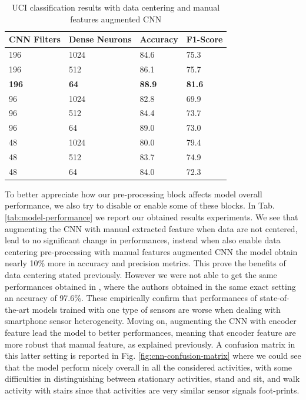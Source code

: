 \begin{table}[h]
	\begin{center}
		\begin{tabular}{ p{1.8cm}p{1.7cm}p{1.7cm}p{1.7cm} }
			\hline
			CNN Filters & Dense Neurons & Accuracy & F1-Score \\
			\hline
			196 & 1024 & 84.6 & 75.3 \\
			196 & 512 & 86.1 & 75.7 \\
			\textbf{196} & \textbf{64} & \textbf{88.9} & \textbf{81.6} \\
			96 & 1024 & 82.8 & 69.9 \\
			96 & 512 & 84.4 & 73.7 \\
			96 & 64 & 89.0 & 73.0 \\
			48 & 1024 & 80.0 & 79.4 \\
			48 & 512 & 83.7 & 74.9 \\
			48 & 64 & 84.0 & 72.3 \\
			\hline
		\end{tabular}
		\caption{\label{tab:model-selection} UCI classification results with data centering and manual features augmented CNN}
	\end{center}
\end{table}


To better appreciate how our pre-processing block affects model overall performance, we also try to disable or enable some of these blocks. In Tab. \ref{tab:model-performance} we report our obtained results experiments. We see that augmenting the CNN with manual extracted feature when data are not centered, lead to no significant change in performances, instead when also enable data centering pre-processing with manual features augmented CNN the model obtain nearly 10\% more in accuracy and precision metrics. This prove the benefits of data centering stated previously. However we were not able to get the same performances obtained in \cite{ignatov2018real}, where the authors obtained in the same exact setting an accuracy of 97.6\%. These empirically confirm that performances of state-of-the-art models trained with one type of sensors are worse when dealing with smartphone sensor heterogeneity. Moving on, augmenting the CNN with encoder feature lead the model to better performances, meaning that encoder feature are more robust that manual feature, as explained previously. A confusion matrix in this latter setting is reported in Fig. \ref{fig:cnn-confusion-matrix} where we could see that the model perform nicely overall in all the considered activities, with some difficulties in distinguishing between stationary activities, stand and sit, and walk activity with stairs since that activities are very similar sensor signals foot-prints.


